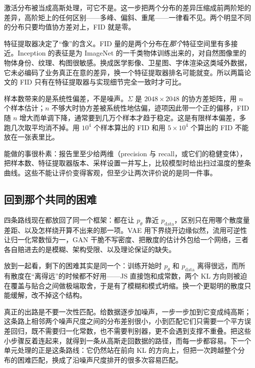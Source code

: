 激活分布被当成高斯处理，可它不是。这一步把两个分布的差异压缩成前两阶矩的差异，高阶矩上的任何区别——多峰、偏斜、重尾——一律看不见。两个明显不同的分布只要均值协方差对上，FID 就是零。

特征提取器决定了``像''的含义。FID 量的是两个分布在\emph{那个}特征空间里有多接近。Inception 的表征是为 ImageNet 的一千类物体训练出来的，对自然图像里的物体身份、纹理、构图很敏感。换成医学影像、卫星图、字体渲染这类域外数据，它未必编码了业务真正在意的差异，换一个特征提取器排名可能就变。所以两篇论文的 FID 只有在特征提取器与实现细节完全一致时才可比。

样本数带来的是系统性偏差，不是噪声。\(\Sigma\) 是 \(2048\times2048\) 的协方差矩阵，用 \(n\) 个样本估计；\(n\) 不够大时协方差被系统性地估偏，迹项因此带一个正的偏移，FID 随 \(n\) 增大而单调下降，通常要到几万个样本才趋于稳定。这是有限样本偏差，多跑几次取平均消不掉。用 \(10^4\) 个样本算出的 FID 和用 \(5\times10^4\) 个算出的 FID 不能放在一张表里比。

能做的事很朴素：报告里至少给两维（precision 与 recall，或它们的稳健变体），把样本数、特征提取器版本、采样设置一并写上，比较模型时给出扫过温度的整条曲线。这些不能让评价变得客观，但至少让两次评价说的是同一件事。

\subsection{回到那个共同的困难}

四条路线现在都放回了同一个框架：都在让 \(p_\theta\) 靠近 \(p_{\text{data}}\)，区别只在用哪个散度量差距、以及怎样绕开算不出来的那一项。VAE 用下界绕开边缘似然，流用可逆性让归一化常数恒为一，GAN 干脆不写密度、把散度的估计外包给一个网络，三者各自赔进去的是模糊、架构受限、以及理论保证的缺失。

放到一起看，剩下的困难其实是同一个：训练开始时 \(p_\theta\) 和 \(p_{\text{data}}\) 离得很远，而所有散度在``离得远''的时候都不好用——JS 直接饱和成常数，两个 KL 方向则被迫在覆盖与贴合之间做极端取舍，于是有了模糊和模式坍缩。换一个更聪明的散度只能缓解，改不掉这个结构。

真正的出路是不要一次性匹配。给数据逐步加噪声，一步一步加到它变成纯高斯；这条路上相邻两个噪声尺度之间的分布差别很小，小到匹配它们只需要一个平方误差回归，既不需要归一化常数，也不需要判别器，更不会遇到支撑不重叠。把这些小步骤反着连起来，就得到一条从高斯走回数据的路径，而每一步都容易。下一个单元处理的正是这条路线：它仍然站在前向 KL 的方向上，但把一次跨越整个分布的困难匹配，换成了沿噪声尺度排开的很多次容易匹配。
